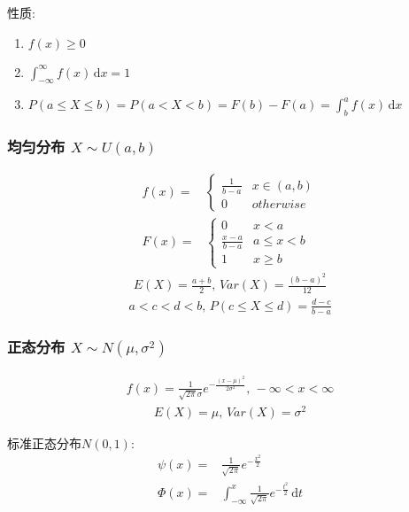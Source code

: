 性质:
\begin{enumerate}
    \item $f(x)\ge 0$
    \item $\int_{-\infty}^{\infty}f(x)\,\mathrm{d}x=1$
    \item $P(a\le X\le b)=P(a<X<b)=F(b)-F(a)=\int_{b}^{a}f(x)\,\mathrm{d}x$
\end{enumerate}

\subsubsection{均匀分布 \texorpdfstring{$X\sim U(a,b)$}.}
\begin{align*}
    f(x)=&\left\{\begin{array}{lc}
        \frac{1}{b-a} & x\in(a,b)\\0 & otherwise
    \end{array} \right.\\
    F(x)=&\left\{\begin{array}{lc}
        0 & x<a\\ \frac{x-a}{b-a} & a\le x<b \\ 1 & x\ge b
    \end{array} \right.
\end{align*}
\begin{align*}
    E(X)=\frac{a+b}{2}, \, Var(X)=\frac{(b-a)^2}{12}
\end{align*}
\begin{align*}
    a<c<d<b, \, P(c\le X \le d)=\frac{d-c}{b-a}
\end{align*}

\subsubsection{正态分布 \texorpdfstring{$X\sim N(\mu,\sigma^2)$}.}
\begin{align*}
    f(x)=\frac{1}{\sqrt{2\pi} \sigma}e^{-\frac{(x-\mu)^2}{2\sigma^2}}, \, -\infty<x<\infty
\end{align*}
\begin{align*}
    E(X)=\mu,\,Var(X)=\sigma^2
\end{align*}

标准正态分布$N(0,1)$:
\begin{align*}
    \psi(x)=&\frac{1}{\sqrt{2\pi}}e^{-\frac{x^2}{2}}\\
    \Phi(x)=&\int_{-\infty}^x \frac{1}{\sqrt{2\pi}}e^{-\frac{t^2}{2}}\,\mathrm{d}t
\end{align*}

